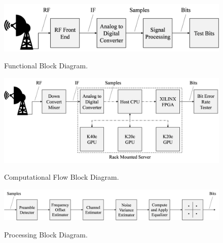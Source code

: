 \begin{figure}

	\centering\includegraphics[width=9.25in/100*55]{figures/systemOverview/FunctionalBlock.pdf}
	\label{fig:FunctionalBlock}
		\caption{Functional Block Diagram.}
\end{figure}
\begin{figure}
	\centering\includegraphics[width=11.25in/100*55]{figures/systemOverview/ComputationalFlowBlock.pdf}
	\label{fig:ComputationalFlowBlock}
		\caption{Computational Flow Block Diagram.}
\end{figure}
\clearpage
\begin{figure}
	\centering\includegraphics[width=12.89in/100*55]{figures/systemOverview/ProcessingBlock_new.pdf}
	\label{fig:ProcessingBlock_new}
	\caption{Processing Block Diagram.}
\end{figure}
